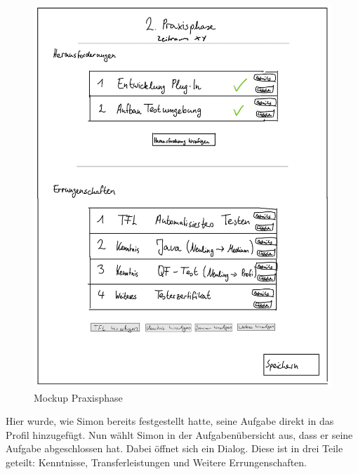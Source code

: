 \documentclass[
  12pt,
  ngerman,
  a4paper,
]{article}
\begin{document}
\begin{figure}
\centering
\includegraphics{./tex2pdf.-930e6666e1221838/859338669394b102ded1dca6abb3332766db3cbf.jpg}
\caption{Mockup Praxisphase}
\end{figure}

Hier wurde, wie Simon bereits festgestellt hatte, seine Aufgabe direkt
in das Profil hinzugefügt. Nun wählt Simon in der Aufgabenübersicht aus,
dass er seine Aufgabe abgeschlossen hat. Dabei öffnet sich ein Dialog.
Diese ist in drei Teile geteilt: Kenntnisse, Transferleistungen und
Weitere Errungenschaften.
\end{document}

